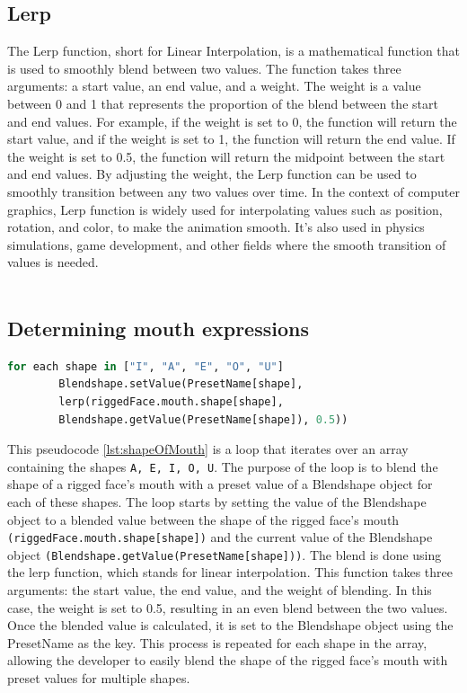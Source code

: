 \subsection{Lerp}
The Lerp function, short for Linear Interpolation, is a mathematical function that is 
used to smoothly blend between two values. The function takes three arguments: a start value, 
an end value, and a weight. The weight is a value between 0 and 1 that represents the proportion 
of the blend between the start and end values.
For example, if the weight is set to 0, the function will return the start 
value, and if the weight is set to 1, the function will return the end value. 
If the weight is set to 0.5, the function will return the midpoint between the 
start and end values. By adjusting the weight, the Lerp function can be used to 
smoothly transition between any two values over time.
In the context of computer graphics, Lerp function is widely used for 
interpolating values such as position, rotation, and color, to make the 
animation smooth. It's also used in physics simulations, game development, 
and other fields where the smooth transition of values is needed.
\\
\\
\subsection{Determining mouth expressions}

\begin{lstlisting}[language=Python,caption=Shape of mouth,label=lst:shapeOfMouth]
    for each shape in ["I", "A", "E", "O", "U"]
        Blendshape.setValue(PresetName[shape], 
        lerp(riggedFace.mouth.shape[shape], 
        Blendshape.getValue(PresetName[shape]), 0.5))

\end{lstlisting}
This pseudocode \ref{lst:shapeOfMouth} is a loop that iterates over an array containing the shapes \texttt{A, E, I, O, U}. 
The purpose of the loop is to blend the shape of a rigged face's mouth with a preset value of a 
Blendshape object for each of these shapes. The loop starts by setting the value of the Blendshape 
object to a blended value between the shape of the rigged face's mouth \texttt{(riggedFace.mouth.shape[shape])}
and the current value of the Blendshape object \texttt{(Blendshape.getValue(PresetName[shape]))}. 
The blend is done using the lerp function, which stands for linear interpolation. 
This function takes three arguments: the start value, the end value, and the weight of blending. 
In this case, the weight is set to 0.5, resulting in an even blend between the two values.
Once the blended value is calculated, it is set to the Blendshape object using the PresetName 
as the key. This process is repeated for each shape in the array, allowing the developer to 
easily blend the shape of the rigged face's mouth with preset values for multiple shapes.
\\
\\
